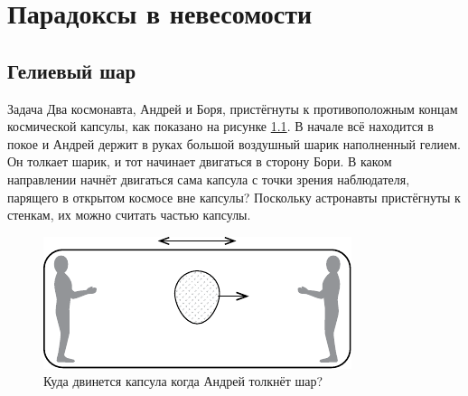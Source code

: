 \chapter{Парадоксы в невесомости}

\section{Гелиевый шар}

\begin{thm}{Задача}
Два космонавта, Андрей и Боря, пристёгнуты к противоположным концам космической капсулы, как показано на рисунке \ref{pic:2.1}.
В начале всё находится в покое и Андрей держит в руках большой воздушный шарик наполненный гелием.
Он толкает шарик, и тот начинает двигаться в сторону Бори.
В каком направлении начнёт двигаться сама капсула с точки зрения наблюдателя, парящего в открытом космосе вне капсулы?
Поскольку астронавты пристёгнуты к стенкам, их можно считать частью капсулы.
\end{thm}

\begin{figure}[ht!]
\centering
\includegraphics[scale=1]{pics/2.1}
\caption{Куда двинется капсула когда Андрей толкнёт шар?}
\label{pic:2.1}
\end{figure}
